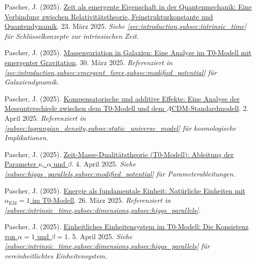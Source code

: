 \documentclass[12pt,a4paper]{article}
\newcommand{\alphaEM}{\alpha_{\text{EM}}}
\begin{document}
	\begin{thebibliography}{9}
		 Pascher, J. (2025). \href{https://github.com/jpascher/T0-Time-Mass-Duality/tree/main/2/pdf/Deutsch/ZeitEmergentQM.pdf}{Zeit als emergente Eigenschaft in der Quantenmechanik: Eine Verbindung zwischen Relativitätstheorie, Feinstrukturkonstante und Quantendynamik}. 23. März 2025. \textit{Siehe \cref{sec:introduction,subsec:intrinsic_time} für Schlüsselkonzepte zur intrinsischen Zeit.}
		
		 Pascher, J. (2025). \href{https://github.com/jpascher/T0-Time-Mass-Duality/tree/main/2/pdf/Deutsch/MassVarGalaxien.pdf}{Massenvariation in Galaxien: Eine Analyse im T0-Modell mit emergenter Gravitation}. 30. März 2025. \textit{Referenziert in \cref{sec:introduction,subsec:emergent_force,subsec:modified_potential} für Galaxiendynamik.}
		
		 Pascher, J. (2025). \href{https://github.com/jpascher/T0-Time-Mass-Duality/tree/main/2/pdf/Deutsch/MessdifferenzenT0Standard.pdf}{Kompensatorische und additive Effekte: Eine Analyse der Messunterschiede zwischen dem T0-Modell und dem $\Lambda$CDM-Standardmodell}. 2. April 2025. \textit{Referenziert in \cref{subsec:lagrangian_density,subsec:static_universe_model} für kosmologische Implikationen.}
		
		 Pascher, J. (2025). \href{https://github.com/jpascher/T0-Time-Mass-Duality/tree/main/2/pdf/Deutsch/ZeitMasseT0Params.pdf}{Zeit-Masse-Dualitätstheorie (T0-Modell): Ableitung der Parameter $\kappa$, $\alpha$ und $\beta$}. 4. April 2025. \textit{Siehe \cref{subsec:higgs_parallels,subsec:modified_potential} für Parameterableitungen.}
		
		 Pascher, J. (2025). \href{https://github.com/jpascher/T0-Time-Mass-Duality/tree/main/2/pdf/Deutsch/NatEinheitenAlpha1.pdf}{Energie als fundamentale Einheit: Natürliche Einheiten mit $\alphaEM = 1$ im T0-Modell}. 26. März 2025. \textit{Referenziert in \cref{subsec:intrinsic_time,subsec:dimensions,subsec:higgs_parallels}.}
		
		 Pascher, J. (2025). \href{https://github.com/jpascher/T0-Time-Mass-Duality/tree/main/2/pdf/Deutsch/Alpha1Beta1Konsistenz.pdf}{Einheitliches Einheitensystem im T0-Modell: Die Konsistenz von $\alpha = 1$ und $\beta = 1$}. 5. April 2025. \textit{Siehe \cref{subsec:intrinsic_time,subsec:dimensions,subsec:higgs_parallels} für vereinheitlichtes Einheitensystem.}
		

\end{thebibliography}
\end{document}
